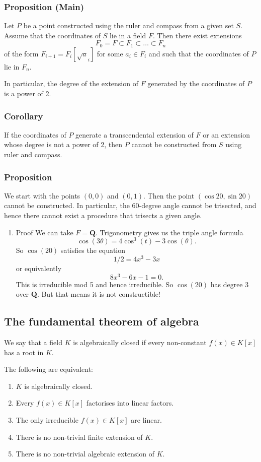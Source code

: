 \documentclass[11pt]{article}
\begin{document}
\subsubsection{Proposition (Main)}
\label{sec:org50416c9}
Let \(P\) be a point constructed using the ruler and compass from a given set \(S\).
Assume that the coordinates of \(S\) lie in a field \(F\).
Then there exist extensions
\[ F_{0} = F \subset F_1 \subset \dots \subset F_{n}\]
of the form \(F_{i+1} = F_i[\sqrt a_i]\) for some \(a_i \in F_i\) and such that the coordinates of \(P\) lie in \(F_{n}\).

In particular, the degree of the extension of \(F\) generated by the coordinates of \(P\) is a power of 2.
\subsubsection{Corollary}
\label{sec:org96b50e7}
If the coordinates of \(P\) generate a transcendental extension of \(F\) or an extension whose degree is not a power of 2, then \(P\) cannot be constructed from \(S\) using ruler and compass.
\subsubsection{Proposition}
\label{sec:org77cb113}
We start with the points \((0,0)\) and \((0,1)\).
Then the point \((\cos 20, \sin 20)\) cannot be constructed.
In particular, the \(60\)-degree angle cannot be trisected, and hence there cannot exist a procedure that trisects a given angle.
\begin{enumerate}
\item Proof
\label{sec:org125e949}
We can take \(F = \mathbf{Q}\).
Trigonometry gives us the triple angle formula
\[ \cos(3\theta) = 4 \cos^3(t) - 3 \cos(\theta).\]
So \(\cos(20)\) satisfies the equation
\[ 1/2 = 4 x^3 - 3x\]
or equivalently
\[ 8x^3-6x-1 = 0.\]
This is irreducible mod 5 and hence irreducible.
So \(\cos(20)\) has degree 3 over \(\mathbf{Q}\).
But that means it is not constructible!
\end{enumerate}
\subsection{The fundamental theorem of algebra}
\label{sec:orga2ddf62}
We say that a field \(K\) is algebraically closed if every non-constant \(f(x) \in K[x]\) has a root in \(K\).

The following are equivalent:
\begin{enumerate}
\item \(K\) is algebraically closed.
\item Every \(f(x) \in K[x]\) factorises into linear factors.
\item The only irreducible \(f(x) \in K[x]\) are linear.
\item There is no non-trivial finite extension of \(K\).
\item There is no non-trivial algebraic extension of \(K\).
\end{enumerate}
\end{document}
